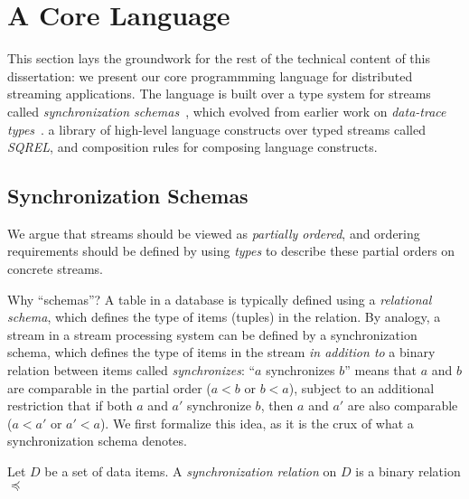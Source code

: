 \section{A Core Language}
\label{sec:language}

This section lays the groundwork for the rest of the technical content of this dissertation: we present our core programmming language for distributed streaming applications. The language is built over a type system for streams called \emph{synchronization schemas}~, which evolved from earlier work on \emph{data-trace types}~. a library of high-level language constructs over typed streams called \emph{SQREL}, and composition rules for composing language constructs.

\subsection{Synchronization Schemas}

We argue that streams should be viewed as \emph{partially ordered},
and ordering requirements should be defined by using
\emph{types} to describe these partial orders on concrete streams.

Why ``schemas''? A table in a database is typically defined using a \emph{relational schema}, which defines the type of items (tuples) in the relation. By analogy, a stream in a stream processing system can be defined by a synchronization schema, which defines the type of items in the stream \emph{in addition to} a binary relation between items called \emph{synchronizes}: ``$a$ synchronizes $b$'' means that $a$ and $b$ are comparable in the partial order ($a < b$ or $b < a$), subject to an additional restriction that if both $a$ and $a'$ synchronize $b$, then $a$ and $a'$ are also comparable ($a < a'$ or $a' < a$).
We first formalize this idea, as it is the crux of what a synchronization schema denotes.

\begin{definition}
Let $D$ be a set of data items. A \emph{synchronization relation} on $D$ is a binary relation $\preceq$
\end{definition}
